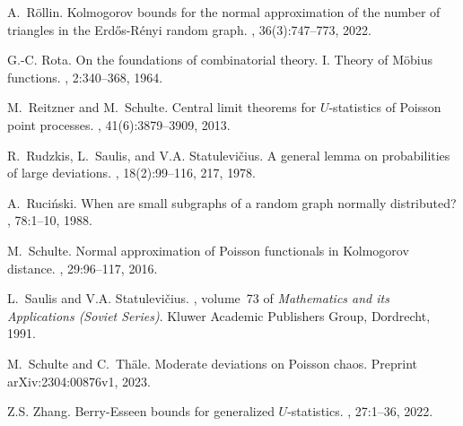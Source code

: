 \documentclass[12pt]{article}
\let\Horig\H
\numberwithin{equation}{section}
\begin{document}
\begin{thebibliography}{BRSW17}

A.~R{\"o}llin.
\newblock Kolmogorov bounds for the normal approximation of the number of
  triangles in the {E}rd{\Horig{o}}s-{R}\'enyi random graph.
,
  36(3):747--773, 2022.

G.-C. Rota.
\newblock On the foundations of combinatorial theory. {I}. {T}heory of
  {M}\"obius functions.
, 2:340--368,
  1964.

M.~Reitzner and M.~Schulte.
\newblock Central limit theorems for ${U}$-statistics of {P}oisson point
  processes.
, 41(6):3879--3909, 2013.

R.~Rudzkis, L.~Saulis, and V.A. Statulevi\v{c}ius.
\newblock A general lemma on probabilities of large deviations.
, 18(2):99--116, 217, 1978.

A.~Ruci{\'n}ski.
\newblock When are small subgraphs of a random graph normally distributed?
, 78:1--10, 1988.

M.~Schulte.
\newblock Normal approximation of {P}oisson functionals in {K}olmogorov
  distance.
, 29:96--117, 2016.

L.~Saulis and V.A. Statulevi\v{c}ius.
, volume~73 of {\em
  Mathematics and its Applications (Soviet Series)}.
\newblock Kluwer Academic Publishers Group, Dordrecht, 1991.

M.~Schulte and C.~Th{\"a}le.
\newblock Moderate deviations on {P}oisson chaos.
\newblock Preprint arXiv:2304:00876v1, 2023.

Z.S. Zhang.
\newblock Berry-{E}sseen bounds for generalized {$U$}-statistics.
, 27:1--36, 2022.

\end{thebibliography}
\end{document}
